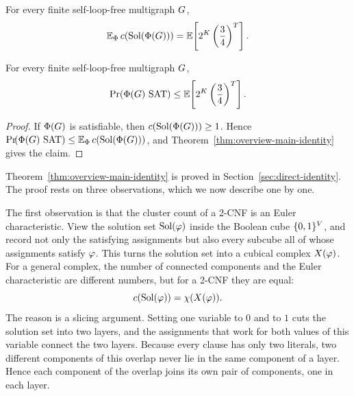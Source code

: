 \begin{theorem}\label{thm:overview-main-identity}
For every finite self-loop-free multigraph \(G\),
\[
  \E_{\Phi}\,\solcomp{\rform{\Gin}}
  =
  \Ex{2^{\Kdef}\left(\frac34\right)^{\Tdef}} .
\]
\end{theorem}

\begin{corollary}\label{cor:overview-sat-bound}
For every finite self-loop-free multigraph \(G\),
\[
  \Prx{\rform{\Gin}\SAT}
  \le
  \Ex{2^{\Kdef}\left(\frac34\right)^{\Tdef}} .
\]
\end{corollary}

\begin{proof}
If \(\Phi(G)\) is satisfiable, then \(c(\operatorname{Sol}(\Phi(G)))\ge1\).
Hence \(\Prx{\rform{\Gin}\SAT}\le\E_{\Phi}\,\solcomp{\rform{\Gin}}\), and
Theorem~\ref{thm:overview-main-identity} gives the claim.
\end{proof}

Theorem~\ref{thm:overview-main-identity} is proved in
Section~\ref{sec:direct-identity}. The proof rests on three observations, which
we now describe one by one.

The first observation is that the cluster count of a 2-CNF is an Euler
characteristic. View the solution set \(\operatorname{Sol}(\varphi)\) inside the Boolean cube
\(\{0,1\}^{V}\), and record not only the satisfying assignments but also
every subcube all of whose assignments satisfy \(\varphi\). This turns the
solution set into a cubical complex \(X(\varphi)\). For a general complex, the
number of connected components and the Euler characteristic are different
numbers, but for a 2-CNF they are equal:
\[
  c(\operatorname{Sol}(\varphi))=\chi(X(\varphi)) .
\]
The reason is a slicing argument. Setting one variable to \(0\) and to \(1\)
cuts the solution set into two layers, and the assignments that work for both
values of this variable connect the two layers. Because every clause has only
two literals, two different components of this overlap never lie in the same
component of a layer. Hence each component of the overlap joins its own pair of
components, one in each layer.

